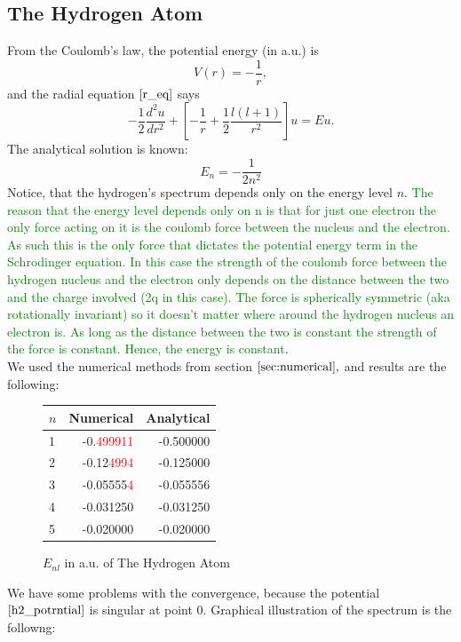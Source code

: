 \documentclass[a4paper, 12pt]{article}
\begin{document}
\subsection{The Hydrogen Atom}
From the Coulomb's law, the potential energy (in a.u.) is 
\begin{equation}\label{h2_potrntial}
	V(r) = -\frac{1}{r},
\end{equation}
and the radial equation $\eqref{r_eq}$  says
$$-\frac{1}{2}\frac{d^2 u}{dr^2}+[-\frac{1}{r}+\frac{1}{2}\frac{l(l+1)}{r^2}]u = Eu.$$
The analytical solution is known:
\begin{equation}\label{h2_sol}
   E_n = -\frac{1}{2 n^2}
\end{equation}
Notice, that the hydrogen's spectrum depends only on the energy level $n.$ \textcolor{green}{The reason that the energy level depends only on n is that for just one electron the only force acting on it is the coulomb force between the nucleus and the electron. As such this is the only force that dictates the potential energy term in the Schrodinger equation. In this case the strength of the coulomb force between the hydrogen nucleus and the electron only depends on the distance between the two and the charge involved (2q in this case). The force is spherically symmetric (aka rotationally invariant) so it doesn't matter where around the hydrogen nucleus an electron is. As long as the distance between the two is constant the strength of the force is constant. Hence, the energy is constant}.\\
We used the numerical methods from section $\ref{sec:numerical},$ and results are the following:
\begin{figure}[h!]
\centering
\begin{tabular}{lrr}
\toprule
\centering
$n$ &         Numerical &         Analytical \\
\midrule
1 & -0.\textcolor{red}{499911} & -0.500000 \\
2 & -0.12\textcolor{red}{4994} & -0.125000 \\
3 & -0.05555\textcolor{red}{4} & -0.055556 \\
4 & -0.031250 & -0.031250 \\
5 & -0.020000 & -0.020000 \\
\bottomrule
\end{tabular}
\caption{$E_{nl}$ in a.u. of The Hydrogen Atom}
\end{figure}
We have some problems with the convergence, because the potential $\eqref{h2_potrntial}$ is singular at point 0. Graphical illustration of the spectrum is the followng:
\end{document}
